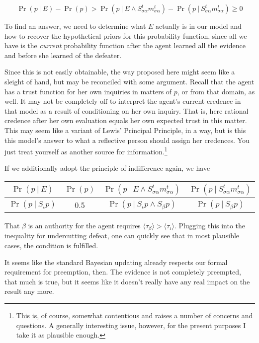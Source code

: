 \documentclass[11pt, a4paper]{scrartcl}
\newcommand{\Stsa}{S^t_{\sigma\alpha}}
\newcommand{\sa}{{\sigma\alpha}}
\newcommand{\given}[1][]{\:#1\vert\:}
\newcommand{\Sm}{\Stsa{}m^t_{\sa}}
\renewcommand{\i}[1]{\emph{#1}}
\begin{document}
\[
    \Pr(p \given E) - \Pr(p) > \Pr(p \given E \land \Sm) - \Pr(p \given \Sm) \geqslant 0
\]

To find an answer, we need to determine what $E$ actually is in our model and how to recover the hypothetical priors for this probability function, since all we have is the \i{current} probability function after the agent learned all the evidence and before she learned of the defeater. 

Since this is not easily obtainable, the way proposed here might seem like a sleight of hand, but may be reconciled with some argument. Recall that the agent has a trust function for her own inquiries in matters of $p$, or from that domain, as well. It may not be completely off to interpret the agent's current credence in that model as a result of conditioning on her own inquiry. That is, here rational credence after her own evaluation equals her own expected trust in this matter. This may seem like a variant of Lewis' Principal Principle, in a way, but is this this model's answer to what a reflective person should assign her credences. You just treat yourself as another source for information.\footnote{This is, of course, somewhat contentious and raises a number of concerns and questions. A generally interesting issue, however, for the present purposes I take it as plausible enough.}   


If we additionally adopt the principle of indifference again, we have

\begin{table}[ht]
\centering
\begin{tabular}{@{}cccc@{}}
\toprule
$\Pr(p \given E)$ & $\Pr(p)$ & $\Pr(p \given E \land \Sm)$ & $\Pr(p \given \Sm)$ \\ \midrule
$\Pr(p \given S_{\iota}p )$ & 0.5 & $\Pr(p \given S_\iota p \land S_\beta p)$ & $\Pr(p \given S_\beta p)$
\end{tabular}
\end{table}

That $\beta$ is an authority for the agent requires $\langle \tau_\beta \rangle > \langle \tau_\iota \rangle$. Plugging this into the inequality for undercutting defeat, one can quickly see that in most plausible cases, the condition is fulfilled.

It seems like the standard Bayesian updating already respects our formal requirement for preemption, then. The evidence is not completely preempted, that much is true, but it seems like it doesn't really have any real impact on the result any more.  
\end{document}

